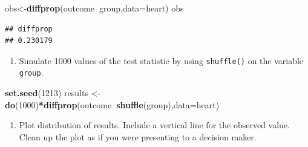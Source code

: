 \documentclass[
]{book}
\newenvironment{Shaded}{\begin{snugshade}}{\end{snugshade}}
\newcommand{\DataTypeTok}[1]{\textcolor[rgb]{0.13,0.29,0.53}{#1}}
\newcommand{\DecValTok}[1]{\textcolor[rgb]{0.00,0.00,0.81}{#1}}
\newcommand{\KeywordTok}[1]{\textcolor[rgb]{0.13,0.29,0.53}{\textbf{#1}}}
\newcommand{\NormalTok}[1]{#1}
\newcommand{\OperatorTok}[1]{\textcolor[rgb]{0.81,0.36,0.00}{\textbf{#1}}}
\newcommand{\StringTok}[1]{\textcolor[rgb]{0.31,0.60,0.02}{#1}}
\providecommand{\tightlist}{%
  \setlength{\itemsep}{0pt}\setlength{\parskip}{0pt}}
\begin{document}
\begin{Shaded}
\begin{Highlighting}[]
\NormalTok{obs<-}\KeywordTok{diffprop}\NormalTok{(outcome}\OperatorTok{~}\NormalTok{group,}\DataTypeTok{data=}\NormalTok{heart)}
\NormalTok{obs}
\end{Highlighting}
\end{Shaded}

\begin{verbatim}
## diffprop 
## 0.230179
\end{verbatim}

\begin{enumerate}
\def\labelenumi{\alph{enumi}.}
\setcounter{enumi}{4}
\tightlist
\item
  Simulate 1000 values of the test statistic by using \texttt{shuffle()} on the variable \texttt{group}.
\end{enumerate}

\begin{Shaded}
\begin{Highlighting}[]
\KeywordTok{set.seed}\NormalTok{(}\DecValTok{1213}\NormalTok{)}
\NormalTok{results <-}\StringTok{ }\KeywordTok{do}\NormalTok{(}\DecValTok{1000}\NormalTok{)}\OperatorTok{*}\KeywordTok{diffprop}\NormalTok{(outcome}\OperatorTok{~}\KeywordTok{shuffle}\NormalTok{(group),}\DataTypeTok{data=}\NormalTok{heart)}
\end{Highlighting}
\end{Shaded}

\begin{enumerate}
\def\labelenumi{\alph{enumi}.}
\setcounter{enumi}{5}
\tightlist
\item
  Plot distribution of results. Include a vertical line for the observed value. Clean up the plot as if you were presenting to a decision maker.
\end{enumerate}

\begin{Shaded}
\end{Shaded}
\end{document}
